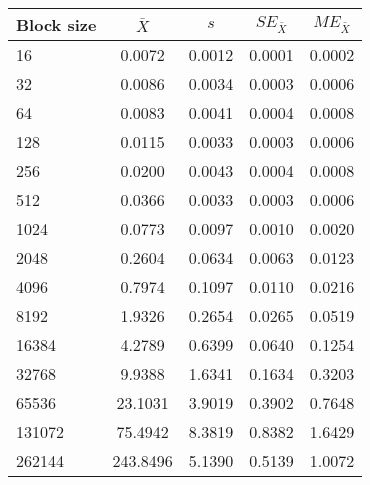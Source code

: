 \begin{tabular}{lcccc}\toprule
{\small Block size} & $\bar{X}$ & $s$ & $SE_{\bar{X}}$ & $ME_{\bar{X}}$ \\\midrule
16 & 0.0072 & 0.0012 & 0.0001 & 0.0002\\
32 & 0.0086 & 0.0034 & 0.0003 & 0.0006\\
64 & 0.0083 & 0.0041 & 0.0004 & 0.0008\\
128 & 0.0115 & 0.0033 & 0.0003 & 0.0006\\
256 & 0.0200 & 0.0043 & 0.0004 & 0.0008\\
512 & 0.0366 & 0.0033 & 0.0003 & 0.0006\\
1024 & 0.0773 & 0.0097 & 0.0010 & 0.0020\\
2048 & 0.2604 & 0.0634 & 0.0063 & 0.0123\\
4096 & 0.7974 & 0.1097 & 0.0110 & 0.0216\\
8192 & 1.9326 & 0.2654 & 0.0265 & 0.0519\\
16384 & 4.2789 & 0.6399 & 0.0640 & 0.1254\\
32768 & 9.9388 & 1.6341 & 0.1634 & 0.3203\\
65536 & 23.1031 & 3.9019 & 0.3902 & 0.7648\\
131072 & 75.4942 & 8.3819 & 0.8382 & 1.6429\\
262144 & 243.8496 & 5.1390 & 0.5139 & 1.0072\\
\bottomrule
\end{tabular}
